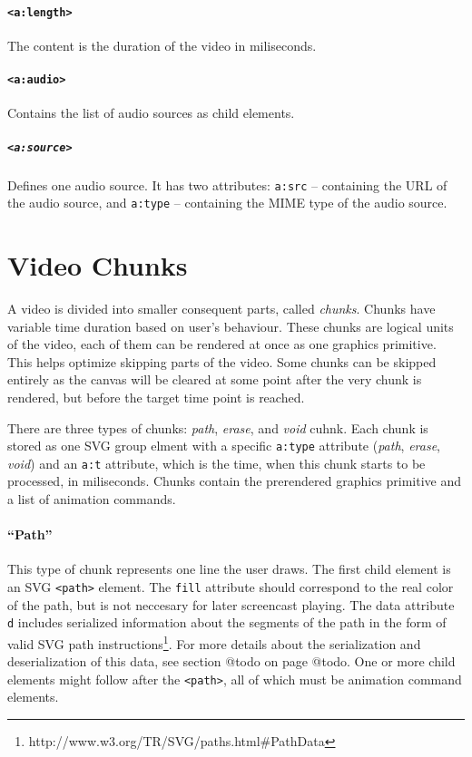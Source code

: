 \paragraph{\texttt{\textless a:length\textgreater}}
The content is the duration of the video in miliseconds.

\paragraph{\texttt{\textless a:audio\textgreater}}
Contains the list of audio sources as child elements.

\subparagraph{\texttt{\textless a:source\textgreater}}
Defines one audio source. It has two attributes: \verb|a:src| -- containing the URL of the audio source, and \verb|a:type| -- containing the MIME type of the audio source.

\section{Video Chunks}
A video is divided into smaller consequent parts, called \textit{chunks}. Chunks have variable time duration based on user's behaviour. These chunks are logical units of the video, each of them can be rendered at once as one graphics primitive. This helps optimize skipping parts of the video. Some chunks can be skipped entirely as the canvas will be cleared at some point after the very chunk is rendered, but before the target time point is reached.

There are three types of chunks: \textit{path}, \textit{erase}, and \textit{void} cuhnk. Each chunk is stored as one SVG group elment with a specific \verb|a:type| attribute (\textit{path}, \textit{erase}, \textit{void}) and an \verb|a:t| attribute, which is the time, when this chunk starts to be processed, in miliseconds. Chunks contain the prerendered graphics primitive and a list of animation commands.

\paragraph{``Path''}
This type of chunk represents one line the user draws. The first child element is an SVG \verb|<path>| element. The \verb|fill| attribute should correspond to the real color of the path, but is not neccesary for later screencast playing. The data attribute \verb|d| includes serialized information about the segments of the path in the form of valid SVG path instructions\footnote{http://www.w3.org/TR/SVG/paths.html\#PathData}. For more details about the serialization and deserialization of this data, see section @todo on page @todo. One or more child elements might follow after the \verb|<path>|, all of which must be animation command elements.

